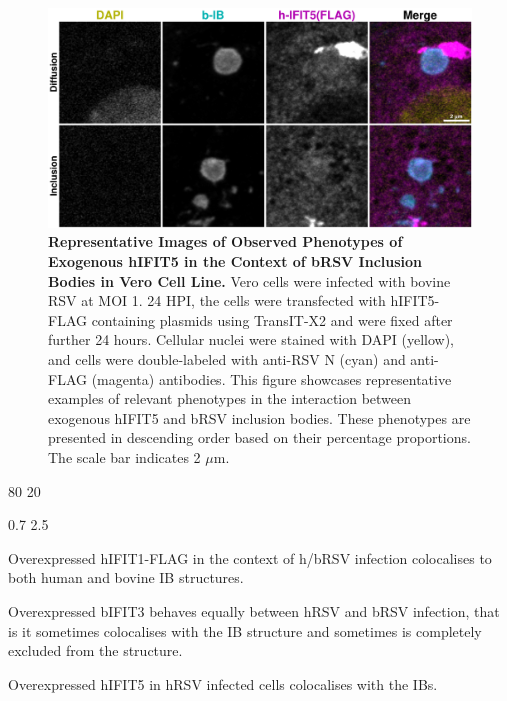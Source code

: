 \begin{figure}
    \centering
    \includegraphics[width=1\linewidth]{09. Chapter 4/Figs/02. Overexpression/04. IFIT5/06. i5-brsv.pdf}
    \caption[Representative Images of Observed Phenotypes of Exogenous hIFIT5 in the Context of bRSV Inclusion Bodies in Vero Cell Line.]{\textbf{Representative Images of Observed Phenotypes of Exogenous hIFIT5 in the Context of bRSV Inclusion Bodies in Vero Cell Line.} Vero cells were infected with bovine RSV at MOI 1. 24 HPI, the cells were transfected with hIFIT5-FLAG containing plasmids using TransIT-X2 and were fixed after further 24 hours. Cellular nuclei were stained with DAPI (yellow), and cells were double-labeled with anti-RSV N (cyan) and anti-FLAG (magenta) antibodies. This figure showcases representative examples of relevant phenotypes in the interaction between exogenous hIFIT5 and bRSV inclusion bodies. These phenotypes are presented in descending order based on their percentage proportions. The scale bar indicates 2 \(\mu \mbox{m}\).}
    \label{fig:Representative Images of Observed Phenotypes of Exogenous hIFIT5 in the Context of bRSV Inclusion Bodies in VERO Cell Line}
\end{figure}

80 20

0.7 2.5

Overexpressed hIFIT1-FLAG in the context of h/bRSV infection colocalises to both human and bovine IB structures.

Overexpressed bIFIT3 behaves equally between hRSV and bRSV infection, that is it sometimes colocalises with the IB structure and sometimes is completely excluded from the structure.

Overexpressed hIFIT5 in hRSV infected cells colocalises with the IBs.
